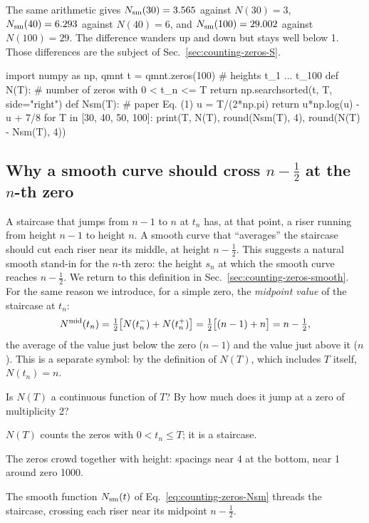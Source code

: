 The same arithmetic gives $N_{\mathrm{sm}}(30)=3.565$ against $N(30)=3$, $N_{\mathrm{sm}}(40)=6.293$ against $N(40)=6$, and $N_{\mathrm{sm}}(100)=29.002$ against $N(100)=29$. The difference wanders up and down but stays well below 1. Those differences are the subject of Sec.~\ref{sec:counting-zeros-S}.

\begin{pycode}
import numpy as np, qmnt
t = qmnt.zeros(100)                 # heights t_1 ... t_100
def N(T):                           # number of zeros with 0 < t_n <= T
    return np.searchsorted(t, T, side="right")
def Nsm(T):                         # paper Eq. (1)
    u = T/(2*np.pi)
    return u*np.log(u) - u + 7/8
for T in [30, 40, 50, 100]:
    print(T, N(T), round(Nsm(T), 4), round(N(T) - Nsm(T), 4))
\end{pycode}

\subsection{Why a smooth curve should cross $n-\tfrac12$ at the $n$-th zero}

A staircase that jumps from $n-1$ to $n$ at $t_n$ has, at that point, a riser running from height $n-1$ to height $n$. A smooth curve that ``averages'' the staircase should cut each riser near its middle, at height $n-\tfrac12$. This suggests a natural smooth stand-in for the $n$-th zero: the height $s_n$ at which the smooth curve reaches $n-\tfrac12$. We return to this definition in Sec.~\ref{sec:counting-zeros-smooth}. For the same reason we introduce, for a simple zero, the \emph{midpoint value} of the staircase at $t_n$:
\[
N^{\rm mid}(t_n)=\tfrac12\bigl[N(t_n^-)+N(t_n^+)\bigr]=\tfrac12\bigl[(n-1)+n\bigr]=n-\tfrac12,
\]
the average of the value just below the zero ($n-1$) and the value just above it ($n$). This is a separate symbol: by the definition of $N(T)$, which includes $T$ itself, $N(t_n)=n$.

\begin{checkpoint}
Is $N(T)$ a continuous function of $T$? By how much does it jump at a zero of multiplicity 2?
\end{checkpoint}

\begin{keyideas}
\item $N(T)$ counts the zeros with $0<t_n\le T$; it is a staircase.
\item The zeros crowd together with height: spacings near 4 at the bottom, near 1 around zero 1000.
\item The smooth function $N_{\mathrm{sm}}(t)$ of Eq.~\eqref{eq:counting-zeros-Nsm} threads the staircase, crossing each riser near its midpoint $n-\tfrac12$.
\end{keyideas}

